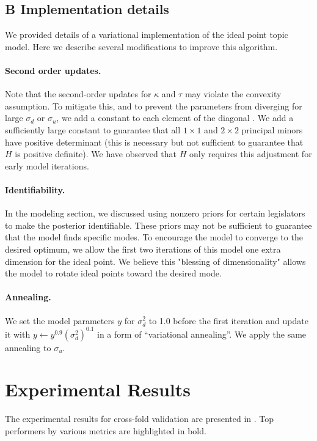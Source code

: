 \subsection*{B \quad Implementation details}

We provided details of a variational implementation of the ideal point
topic model.  Here we describe several modifications to improve this
algorithm.

\paragraph{Second order updates.}  Note that the second-order updates
for $\kappa$ and $\tau$ may violate the convexity assumption.  To
mitigate this, and to prevent the parameters from diverging for large
$\sigma_d$ or $\sigma_u$, we add a constant to each element of the
diagonal \cite{levenberg:1944}.  We add a sufficiently large constant
to guarantee that all $1 \times 1$ and $2 \times 2$ principal minors
have positive determinant (this is necessary but not sufficient to
guarantee that $H$ is positive definite).  We have observed that $H$
only requires this adjustment for early model iterations.

\paragraph{Identifiability.} In the modeling section, we discussed using
nonzero priors for certain legislators to make the posterior
identifiable. These priors may not be sufficient to guarantee that the
model finds specific modes.  To encourage the model to converge to the
desired optimum, we allow the first two iterations of this model one
extra dimension for the ideal point.  We believe this "blessing of
dimensionality" allows the model to rotate ideal points toward the
desired mode.

\paragraph{Annealing.}  We set the model parameters $y$ for
$\sigma_d^2$ to 1.0 before the first iteration and update it with $y
\gets y^{0.9} (\sigma_d^2)^{0.1}$ in a form of ``variational
annealing''.  We apply the same annealing to $\sigma_u$.

\section{Experimental Results}
\label{sec:iptm_app_experimental_results}
The experimental results for cross-fold validation are presented in
.  Top performers by various metrics are
highlighted in bold.

